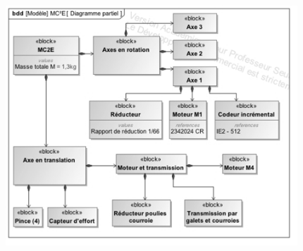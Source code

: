 \documentclass[10pt,fleqn]{article} %
\begin{document}
\begin{center}
\begin{center}
\includegraphics[height=9cm]{images/Sujet/images/fig_03}
\end{center}
\end{center}


%
%
%
%
%
%
\end{document}
